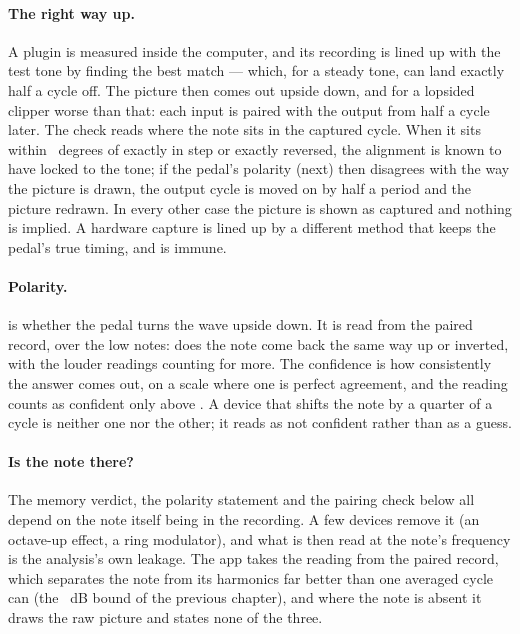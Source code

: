 \documentclass[11pt,a4paper]{article}
\begin{document}
\paragraph{The right way up.} A plugin is measured inside the computer,
and its recording is lined up with the test tone by finding the best
match --- which, for a steady tone, can land exactly half a cycle off. The
picture then comes out upside down, and for a lopsided clipper worse than
that: each input is paired with the output from half a cycle later. The
 check reads where the note sits in the captured cycle.
When it sits within \tcLockToleranceDeg{}~degrees of exactly in step or
exactly reversed, the alignment is known to have locked to the tone; if
the pedal's polarity (next) then disagrees with the way the picture is
drawn, the output cycle is moved on by half a period and the picture
redrawn. In every other case the picture is shown as captured and nothing
is implied. A hardware capture is lined up by a different method that
keeps the pedal's true timing, and is immune.

\paragraph{Polarity.}  is whether the pedal turns the wave
upside down. It is read from the paired record, over the low notes: does
the note come back the same way up or inverted, with the louder readings
counting for more. The confidence is how consistently the answer comes
out, on a scale where one is perfect agreement, and the reading counts as
confident only above \tcPolarityThreshold{}. A device that shifts the note
by a quarter of a cycle is neither one nor the other; it reads as not
confident rather than as a guess.

\paragraph{Is the note there?} The memory verdict, the polarity statement
and the pairing check below all depend on the note itself being in the
recording. A few devices remove it (an octave-up effect, a ring
modulator), and what is then read at the note's frequency is the
analysis's own leakage. The app takes the 
reading from the paired record, which separates the note from its
harmonics far better than one averaged cycle can (the
\tcSeparationDB{}~dB bound of the previous chapter), and where the note
is absent it draws the raw picture and states none of the three.
\end{document}
